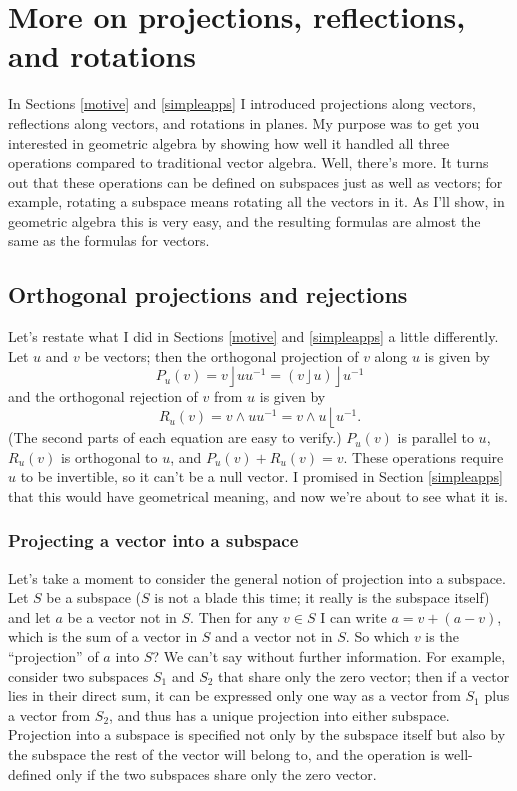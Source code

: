 \documentclass{utarticle}
\DeclareMathOperator{\lin}{\rfloor}
\DeclareMathOperator{\rin}{\lfloor}
\DeclareMathOperator{\out}{\wedge}
\begin{document}
\section{More on projections, reflections, and rotations}
\label{projrefrot}

In Sections \ref{motive} and \ref{simpleapps} I introduced 
projections along vectors, reflections along vectors, and rotations in planes.  My purpose was
to get you interested in geometric algebra by showing how well it handled all three
operations compared to traditional vector algebra.  Well, there's more.  It turns out that these 
operations can be defined on subspaces just as well as vectors; for example, rotating a
subspace means rotating all the vectors in it.  As I'll show, in geometric algebra this is 
very easy, and the resulting formulas are almost the same as the formulas for vectors.

\subsection{Orthogonal projections and rejections}
\label{proj}

Let's restate what I did in Sections \ref{motive} and  \ref{simpleapps} a little differently.  
Let $u$ and $v$ be vectors; then the orthogonal projection of $v$ along $u$ is given by
\begin{equation} 
P_u(v) = v \lin u u^{-1} = (v \lin u) \lin u^{-1} 
\label{projvec}
\end{equation}
and the orthogonal rejection of $v$ from $u$ is given by
\begin{equation} 
R_u(v) = v \out u u^{-1} = v \out u \rin u^{-1}. 
\label{rejvec}
\end{equation}
(The second parts of each equation are easy to verify.)  $P_u(v)$ is parallel to $u$,
$R_u(v)$ is orthogonal to $u$, and $P_u(v) + R_u(v) = v$.  These operations require
$u$ to be invertible, so it can't be a null vector.  I promised in Section \ref{simpleapps} 
that this would have geometrical meaning, and now we're about to see what it is.

\subsubsection{Projecting a vector into a subspace}

Let's take a moment to consider the general notion of projection into a subspace.  
Let $S$ be a subspace ($S$ is not a blade this time; it really is the subspace itself) 
and let $a$ be a vector not in $S$.  Then for any $v \in S$ I can write $a = v + (a - v)$, 
which is the sum of a vector in $S$ and a vector not in $S$.  So which $v$ is the
``projection'' of $a$ into $S$?  We can't say without further information.  
For example, consider two subspaces $S_1$ and $S_2$ that share only the zero 
vector; then if a vector lies in their direct sum, it can be expressed only one way as a 
vector from $S_1$ plus a vector from $S_2$, and thus has a unique projection into 
either subspace.  Projection into a subspace is specified not only by the subspace 
itself but also by the subspace the rest of the vector will belong to, 
and the operation is well-defined only if the two subspaces share only the zero vector.
\end{document}
